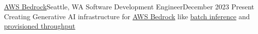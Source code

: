 \resumeSubheading
{\href{https://www.amazon.jobs/en/teams/last-mile}{AWS Bedrock}}{Seattle, WA}
{Software Development Engineer}{December 2023 \textemdash Present}
\resumeItemListStart
{}
{Creating Generative AI infrastructure for \href{https://aws.amazon.com/bedrock/}{AWS Bedrock} like \href{https://docs.aws.amazon.com/bedrock/latest/userguide/batch-inference.html}{batch inference} and \href{https://docs.aws.amazon.com/bedrock/latest/userguide/prov-throughput.html}{provisioned throughput}}
\resumeItemListEnd
